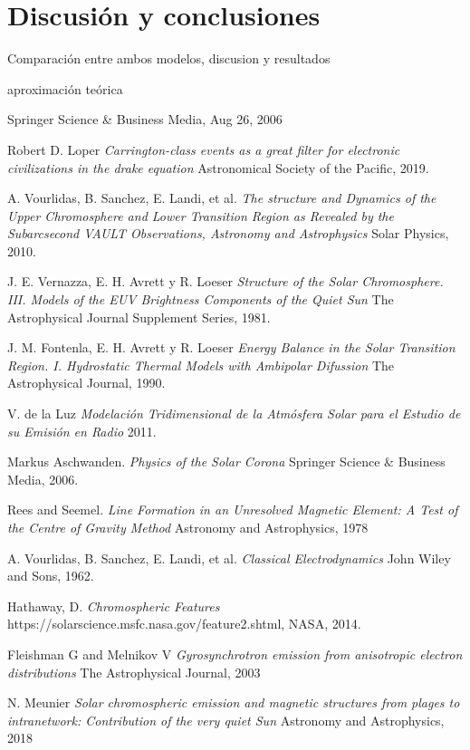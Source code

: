 \documentclass[9pt]{book}
\begin{document}
\chapter{Discusi\'on y conclusiones}
Comparaci\'on entre ambos modelos, discusion y resultados

aproximaci\'on te\'orica
 



Springer Science \& Business Media, Aug 26, 2006

\begin{thebibliography}{9}

Robert D. Loper
\textit{Carrington-class events as a great filter for electronic civilizations in the drake equation} 
Astronomical Society of the Pacific, 2019.

A. Vourlidas, B. Sanchez, E. Landi, et al.
\textit{The structure and Dynamics of the Upper Chromosphere and Lower Transition Region as Revealed by the Subarcsecond VAULT Observations, Astronomy and Astrophysics} 
Solar Physics, 2010.

J. E. Vernazza, E. H. Avrett y R. Loeser
\textit{Structure of the Solar Chromosphere. III. Models of the EUV Brightness Components of the Quiet Sun} 
The Astrophysical Journal Supplement Series, 1981.

J. M. Fontenla, E. H. Avrett y R. Loeser
\textit{Energy Balance in the Solar Transition Region. I. Hydrostatic Thermal Models with Ambipolar Difussion} 
The Astrophysical Journal, 1990.

V. de la Luz
\textit{Modelaci\'on Tridimensional de la Atm\'osfera Solar para el Estudio de su Emisi\'on en Radio} 
2011.

Markus Aschwanden. 
\textit{Physics of the Solar Corona} 
Springer Science \& Business Media, 2006.

Rees and Seemel.
\textit{Line Formation in an Unresolved Magnetic Element: A Test of the Centre of Gravity Method} 
Astronomy and Astrophysics, 1978

A. Vourlidas, B. Sanchez, E. Landi, et al.
\textit{Classical Electrodynamics} 
John Wiley and Sons, 1962.

Hathaway, D.
\textit{Chromospheric Features} 
https://solarscience.msfc.nasa.gov/feature2.shtml, NASA, 2014.

Fleishman G and Melnikov V
\textit{Gyrosynchrotron emission from anisotropic electron distributions} 
The Astrophysical Journal, 2003

N. Meunier
\textit{Solar chromospheric emission and magnetic structures from plages to intranetwork: Contribution of the very quiet Sun} 
Astronomy and Astrophysics, 2018

\end{thebibliography}
\end{document}
